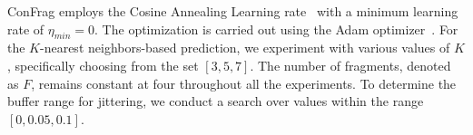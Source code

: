 \documentclass{article}
\theoremstyle{plain}
\theoremstyle{definition}
\theoremstyle{remark}
\begin{document}

ConFrag employs the Cosine Annealing Learning rate~\citep{loshchilov17iclr} with a minimum learning rate of $\eta_{min}=0$.
The optimization is carried out using the Adam optimizer~\citep{kingma15adam}.
For the $K$-nearest neighbors-based prediction, we experiment with various values of $K$, specifically choosing from the set $[3, 5, 7]$. 
The number of fragments, denoted as $F$, remains constant at four throughout all the experiments. 
To determine the buffer range for jittering, we conduct a search over values within the range $[0, 0.05, 0.1]$.
\end{document}
